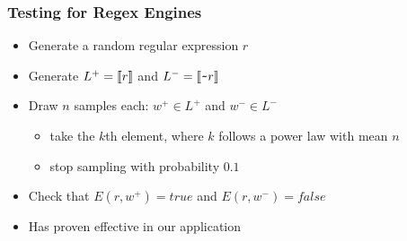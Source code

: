 \documentclass[pdftex,aspectratio=169]{beamer}
\begin{document}
\begin{frame}
  \frametitle{Testing for Regex Engines}
  \begin{itemize}
  \item Generate a random regular expression $r$
  \item Generate $L^+ = \llbracket r\rrbracket$ and $L^- = \llbracket\texttt{\textasciitilde} r\rrbracket$
  \item Draw $n$ samples each: $w^+ \in L^+$ and $w^- \in L^-$
    \begin{itemize}
    \item take the $k$th element, where $k$ follows a power law with mean $n$
    \item stop sampling with probability $0.1$
    \end{itemize}
  \item Check that $E(r, w^+)=true$ and $E(r,w^-)=false$
  \item Has proven effective in our application
  \end{itemize}
\end{frame}
\end{document}
